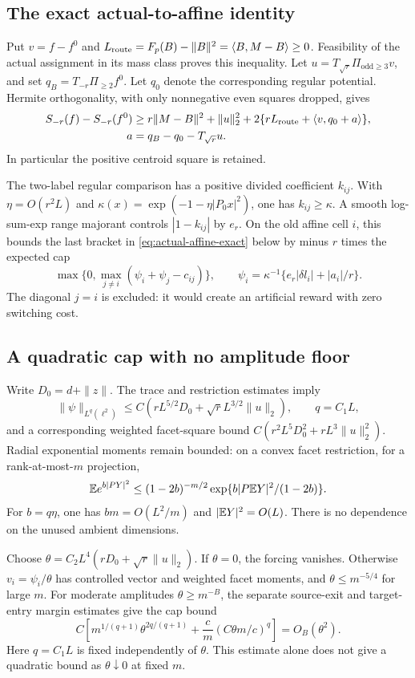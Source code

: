 \subsection{The exact actual-to-affine identity}
Put $v=f-f^0$ and
$L_{\rm route}=F_p(B)-\|B\|^2=\langle B,M-B\rangle\ge0$.
Feasibility of the actual assignment in its mass class proves this
inequality. Let
$u=T_{\sqrt r}\Pi_{\mathrm{odd}\ge3}v$, and set
$q_B=T_{-r}\Pi_{\ge2}f^0$. Let $q_0$ denote the corresponding regular
potential. Hermite orthogonality, with only nonnegative even squares
dropped, gives
\begin{equation}\label{eq:actual-affine-exact}
\begin{aligned}
 S_{-r}(f)-S_{-r}(f^0)
 &\ge r\|M-B\|^2+\|u\|_2^2
       +2\{rL_{\rm route}+\langle v,q_0+a\rangle\},\\
 a&=q_B-q_0-T_{\sqrt r}u.
\end{aligned}
\end{equation}
In particular the positive centroid square is retained.

The two-label regular comparison has a positive divided coefficient
$k_{ij}$. With $\eta=O(r^2L)$ and
$\kappa(x)=\exp(-1-\eta|P_0x|^2)$, one has $k_{ij}\ge\kappa$.
A smooth log-sum-exp range majorant controls $|1-k_{ij}|$ by $e_r$.
On the old affine cell $i$, this bounds the last bracket in
\eqref{eq:actual-affine-exact} below by minus $r$ times the expected cap
\[
 \max\{0,\max_{j\ne i}(\psi_i+\psi_j-c_{ij})\},\qquad
 \psi_i=\kappa^{-1}\{e_r|\delta l_i|+|a_i|/r\}.
\]
The diagonal $j=i$ is excluded: it would create an artificial reward
with zero switching cost.

\subsection{A quadratic cap with no amplitude floor}
Write $D_0=d+\|z\|$. The trace and restriction estimates imply
\[
 \|\psi\|_{L^q(\ell^2)}
 \le C(rL^{5/2}D_0+\sqrt rL^{3/2}\|u\|_2),\qquad q=C_1L,
\]
and a corresponding weighted facet-square bound
$C(r^2L^5D_0^2+rL^3\|u\|_2^2)$. Radial exponential moments remain
bounded: on a convex facet restriction, for a rank-at-most-$m$ projection,
\[
 \mathbb E e^{b|PY|^2}\le(1-2b)^{-m/2}
                 \exp\{b|P\mathbb E Y|^2/(1-2b)\}.
\]
For $b=q\eta$, one has $bm=O(L^2/m)$ and $|\mathbb E Y|^2=O(L)$.
There is no dependence on the unused ambient dimensions.

Choose $\theta=C_2L^4(rD_0+\sqrt r\|u\|_2)$. If $\theta=0$,
the forcing vanishes. Otherwise $v_i=\psi_i/\theta$ has controlled
vector and weighted facet moments, and $\theta\le m^{-5/4}$ for
large $m$. For moderate amplitudes $\theta\ge m^{-B}$, the separate
source-exit and target-entry margin estimates give the cap bound
\[
 C\left[m^{1/(q+1)}\theta^{2q/(q+1)}
             +\frac cm(C\theta m/c)^q\right]=O_B(\theta^2).
\]
Here $q=C_1L$ is fixed independently of $\theta$. This estimate alone
does not give a quadratic bound as $\theta\downarrow0$ at fixed $m$.

